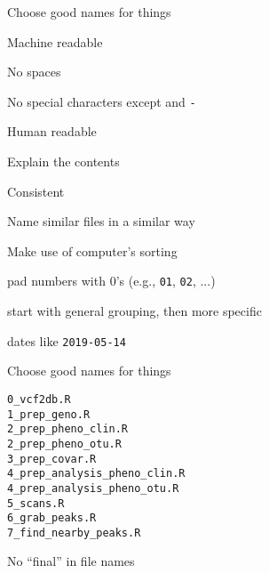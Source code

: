 \documentclass[aspectratio=169,12pt,t]{beamer}
\begin{document}
\begin{frame}[c]{Choose good names for things}

  \bbi
  \item Machine readable
    \bi
    \item No spaces
    \item No special characters except {\textunderscore} and
      {\tt -}
    \ei

  \item Human readable
    \bi
    \item Explain the contents
    \ei

  \item Consistent
    \bi
      \item Name similar files in a similar way
    \ei

  \item Make use of computer's sorting
    \bi
      \item pad numbers with 0's (e.g., {\tt 01}, {\tt 02}, ...)
      \item start with general grouping, then more specific
      \item dates like {\tt 2019-05-14}
    \ei

  \ei

\note{}

\end{frame}


\begin{frame}[fragile,c]{Choose good names for things}

\begin{center}
\begin{minipage}[c]{10.3cm}
\begin{semiverbatim}
\lstset{basicstyle=\normalsize}
\begin{lstlisting}[linewidth=10.3cm]
0_vcf2db.R
1_prep_geno.R
2_prep_pheno_clin.R
2_prep_pheno_otu.R
3_prep_covar.R
4_prep_analysis_pheno_clin.R
4_prep_analysis_pheno_otu.R
5_scans.R
6_grab_peaks.R
7_find_nearby_peaks.R
\end{lstlisting}
\end{semiverbatim}
\end{minipage}
\end{center}

\note{}

\end{frame}



\begin{frame}[c]{No ``{\hilit final}'' in file names}

\vspace*{3mm}

\centering



\end{frame}
\end{document}
